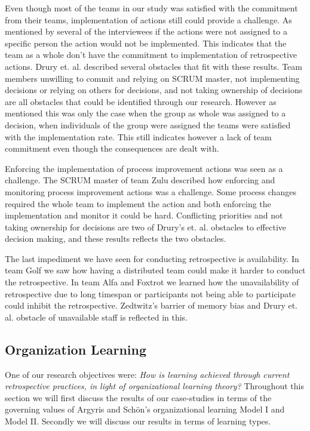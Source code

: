 Even though most of the teams in our study was satisfied with the commitment from their teams, implementation of actions still could provide a challenge. As mentioned by several of the interviewees if the actions were not assigned to a specific person the action would not be implemented. This indicates that the team as a whole don't have the commitment to implementation of retrospective actions. Drury et. al. \cite{Drury2012} described several obstacles that fit with these results. Team members unwilling to commit and relying on SCRUM master, not implementing decisions or relying on others for decisions, and not taking ownership of decisions are all obstacles that could be identified through our research. However as mentioned this was only the case when the group as whole was assigned to a decision, when individuals of the group were assigned the teams were satisfied with the implementation rate. This still indicates however a lack of team commitment even though the consequences are dealt with. 

Enforcing the implementation of process improvement actions was seen as a challenge. The SCRUM master of team Zulu described how enforcing and monitoring process improvement actions was a challenge. Some process changes required the whole team to implement the action and both enforcing the implementation and monitor it could be hard. Conflicting priorities and not taking ownership for decisions are two of Drury's et. al. \cite{Drury2012} obstacles to effective decision making, and these results reflects the two obstacles. 

The last impediment we have seen for conducting retrospective is availability. In team Golf we saw how having a distributed team could make it harder to conduct the retrospective. In team Alfa and Foxtrot we learned how the unavailability of retrospective due to long timespan or participants not being able to participate could inhibit the retrospective. Zedtwitz's \cite{Zedtwitz2002} barrier of memory bias and Drury et. al. \cite{Drury2012} obstacle of unavailable staff is reflected in this. 

\subsection{Organization Learning}
One of our research objectives were: \textit{How is learning achieved through current retrospective practices, in light of organizational learning theory?} Throughout this section we will first discuss the results of our case-studies in terms of the governing values of Argyris and Schön's \cite{Argyris1996} organizational learning Model I and Model II. Secondly we will discuss our results in terms of learning types. 

